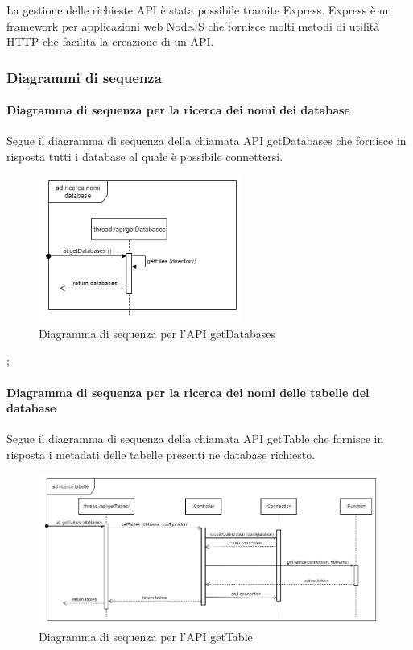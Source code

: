     La gestione delle richieste API è stata possibile tramite Express. Express è un framework per applicazioni web NodeJS che fornisce molti metodi di utilità HTTP che facilita la creazione di un API.
    
    \subsubsection{Diagrammi di sequenza}
    
    \paragraph{Diagramma di sequenza per la ricerca dei nomi dei database}
     Segue il diagramma di sequenza della chiamata API getDatabases che fornisce in risposta tutti i database al quale è possibile connettersi.
            \begin{figure}[H]
                \centering\includegraphics[width=0.6\textwidth]{source/img/API_getDatabases.png}
                \caption{Diagramma di sequenza per l'API getDatabases}
            \end{figure}
            \pagebreak;
            
    \paragraph{Diagramma di sequenza per la ricerca dei nomi delle tabelle del database}
        Segue il diagramma di sequenza della chiamata API getTable che fornisce in risposta i metadati delle tabelle presenti ne database richiesto.
            \begin{figure}[H]
                \centering\includegraphics[width=1\textwidth]{source/img/API_getTable.png}
                \caption{Diagramma di sequenza per l'API getTable}
            \end{figure}
            
